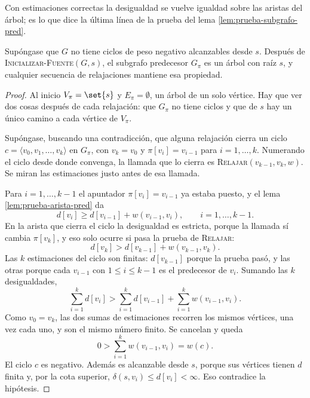 \documentclass[11pt,letterpaper]{article}
\begin{document}
Con estimaciones correctas la desigualdad se vuelve igualdad sobre las
aristas del árbol; es lo que dice la última línea de la prueba del
lema \ref{lem:prueba-subgrafo-pred}.

\begin{lema}[$G_\pi$ es un árbol]\label{lem:prueba-gpi-arbol}
  Supóngase que $G$ no tiene ciclos de peso negativo alcanzables desde
  $s$. Después de \textsc{Inicializar-Fuente}$(G, s)$, el subgrafo
  predecesor $G_\pi$ es un árbol con raíz $s$, y cualquier secuencia
  de relajaciones mantiene esa propiedad.
\end{lema}

\begin{proof}
  Al inicio $V_\pi = \set{s}$ y $E_\pi = \emptyset$, un árbol de un
  solo vértice. Hay que ver dos cosas después de cada relajación: que
  $G_\pi$ no tiene ciclos y que de $s$ hay un único camino a cada
  vértice de $V_\pi$.

   Supóngase, buscando una
  contradicción, que alguna relajación cierra un ciclo
  $c = \langle v_0, v_1, \dots, v_k \rangle$ en $G_\pi$, con
  $v_k = v_0$ y $\pi[v_i] = v_{i-1}$ para $i = 1, \dots, k$.
  Numerando el ciclo desde donde convenga, la llamada que lo cierra es
  \textsc{Relajar}$(v_{k-1}, v_k, w)$. Se miran las estimaciones justo
  antes de esa llamada.

  Para $i = 1, \dots, k - 1$ el apuntador $\pi[v_i] = v_{i-1}$ ya
  estaba puesto, y el lema \ref{lem:prueba-arista-pred} da
  \[
    d[v_i] \ge d[v_{i-1}] + w(v_{i-1}, v_i) ,
    \qquad i = 1, \dots, k - 1 .
  \]
  En la arista que cierra el ciclo la desigualdad es estricta, porque
  la llamada sí cambia $\pi[v_k]$, y eso solo ocurre si pasa la prueba
  de \textsc{Relajar}:
  \[
    d[v_k] > d[v_{k-1}] + w(v_{k-1}, v_k) .
  \]
  Las $k$ estimaciones del ciclo son finitas: $d[v_{k-1}]$ porque la
  prueba pasó, y las otras porque cada $v_{i-1}$ con
  $1 \le i \le k - 1$ es el predecesor de $v_i$. Sumando las $k$
  desigualdades,
  \[
    \sum_{i=1}^{k} d[v_i] > \sum_{i=1}^{k} d[v_{i-1}]
      + \sum_{i=1}^{k} w(v_{i-1}, v_i) .
  \]
  Como $v_0 = v_k$, las dos sumas de estimaciones recorren los mismos
  vértices, una vez cada uno, y son el mismo número finito. Se cancelan
  y queda
  \[
    0 > \sum_{i=1}^{k} w(v_{i-1}, v_i) = w(c) .
  \]
  El ciclo $c$ es negativo. Además es alcanzable desde $s$, porque sus
  vértices tienen $d$ finita y, por la cota superior,
  $\delta(s, v_i) \le d[v_i] < \infty$. Eso contradice la hipótesis.


\end{proof}
\end{document}
